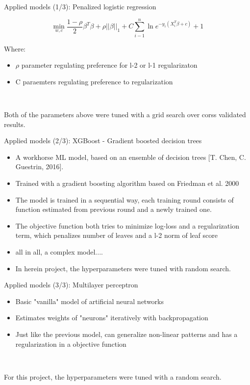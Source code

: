 \documentclass{beamer}
\begin{document}
\begin{frame}{Applied models (1/3): Penalized logistic regression}

$$\min_{w,c} \frac{1-\rho}{2} \beta^{T}\beta + \rho ||\beta||_1 + C \sum_{i-1}^n \ln e^{-y_i(X_i^T \beta + c)}+1$$

Where:

\begin{itemize}
\item $\rho$ parameter regulating preference for l-2 or l-1 regularizaton
\item C paraemters regulating preference to regularization
\end{itemize}

\

Both of the parameters above were tuned with a grid search over corss validated results.


\end{frame}

\begin{frame}{Applied models (2/3): XGBoost - Gradient boosted decision trees}

\begin{itemize}
\item A workhorse ML model, based on an ensemble of decision trees [T. Chen, C. Guestrin, 2016].
\item Trained with a gradient boosting algorithm based on Friedman et al. 2000
\item The model is trained in a sequential way, each training round consists of function estimated from previous round and a newly trained one.
\item The objective function both tries to minimize log-loss and a regularization term, which penalizes number of leaves and a l-2 norm of leaf score
\item all in all, a complex model....

\item In herein project, the hyperparameters were tuned with random search.

\end{itemize}

\end{frame}

\begin{frame}{Applied models (3/3): Multilayer perceptron}

\begin{itemize}
\item Basic "vanilla" model of artificial neural networks
\item Estimates weights of "neurons" iteratively with backpropagation
\item Just like the previous model, can generalize non-linear patterns and has a regularization in a objective function
\end{itemize}

\

For this project, the hyperparameters were tuned with a random search.

\end{frame}
\end{document}
